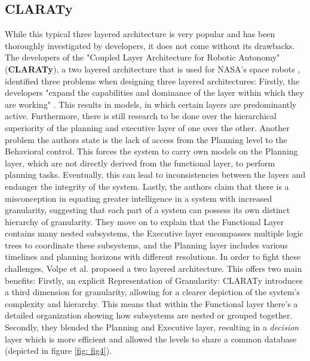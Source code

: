 \documentclass[%
paper=A4,               %
twoside=true,           %
openright,              %
11pt,                   %
bibliography=totoc,     %
titlepage=on,           %
DIV=12,                 %
BCOR=1.5cm,             %
parskip=half,            %
final
]{scrreprt}
\begin{document}
	\subsection{CLARATy}
	\label{subsec:CLARATY}
	While this typical three layered architecture is very popular and has been thoroughly investigated by developers, it does not come without its drawbacks. The developers of the "Coupled Layer Architecture for Robotic Autonomy" (\textbf{CLARATy}), a two layered architecture that is used for NASA's space robots \autocite{sicilianoSpringerHandbookRobotics2016}, identified three problems when designing three layered architectures:
	Firstly, the developers "expand the capabilities and dominance of the layer within which they are working" \autocite{volpeCLARAtyArchitectureRobotic2001}. This results in models, in which certain layers are predominantly active. Furthermore, there is still research to be done over the hierarchical superiority of the planning and executive layer of one over the other. \autocite{volpeCLARAtyArchitectureRobotic2001} Another problem the authors state is the lack of access from the Planning level to the Behavioral control. This forces the system to carry own models on the Planning layer, which are not directly derived from the functional layer, to perform planning tasks. Eventually, this can lead to inconsistencies between the layers and endanger the integrity of the system. \autocite{volpeCLARAtyArchitectureRobotic2001} Lastly, the authors claim that there is a misconception in equating greater intelligence in a system with increased granularity, suggesting that each part of a system can possess its own distinct hierarchy of granularity. They move on to explain that the Functional Layer contains many nested subsystems, the Executive layer encompasses multiple logic trees to coordinate these subsystems, and the Planning layer includes various timelines and planning horizons with different resolutions. \autocite{volpeCLARAtyArchitectureRobotic2001}
	In order to fight these challenges, Volpe et al. proposed a two layered architecture. This offers two main benefits: \newline
	Firstly, an explicit Representation of Granularity: CLARATy introduces a third dimension for granularity, allowing for a clearer depiction of the system's complexity and hierarchy. This means that within the Functional layer there's a detailed organization showing how subsystems are nested or grouped together. Secondly, they blended the Planning and Executive layer, resulting in a \textit{decision} layer which is more efficient and allowed the levels to share a common database (depicted in figure \ref{fig: fig4}). \autocite{volpeCLARAtyArchitectureRobotic2001} 
	
\end{document}
